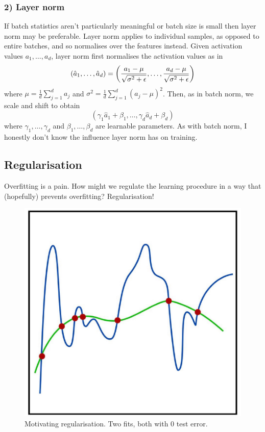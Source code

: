 \documentclass[11pt]{article}
\begin{document}
\subsubsection*{2) Layer norm}
If batch statistics aren't particularly meaningful or batch size is small then layer norm may be preferable. Layer norm applies to individual samples, as opposed to entire batches, and so normalises over the features instead. Given activation values $a_1,\dots,a_d$, layer norm first normalises the activation values as in
$$
(\hat{a}_1,\dots,\hat{a}_d)
=
\left(\frac{a_1-\mu}{\sqrt{\sigma^2+\epsilon}},\dots,\frac{a_d-\mu}{\sqrt{\sigma^2+\epsilon}}\right)
$$
where $\mu=\frac{1}{d}\sum_{j=1}^da_j$ and $\sigma^2=\frac{1}{d}\sum_{j=1}^d(a_j-\mu)^2$. Then, as in batch norm, we scale and shift to obtain
$$
(\gamma_1\hat{a}_1+\beta_1,\dots,\gamma_d\hat{a}_d+\beta_d)
$$
where $\gamma_1,\dots,\gamma_d$ and $\beta_1,\dots,\beta_d$ are learnable parameters. As with batch norm, I honestly don't know the influence layer norm has on training.

\subsection{Regularisation}
Overfitting is a pain. How might we regulate the learning procedure in a way that (hopefully) prevents overfitting? Regularisation!

\begin{figure}[t]
    \centering
    \begin{minipage}{0.44\linewidth}
        \includegraphics[width=1\linewidth]{./figures/supervised_learning/regularisation_two_plots_zero_test_error.pdf}
    \end{minipage}%
    \hfill
    \begin{minipage}{0.55\linewidth}
        \caption{Motivating regularisation. Two fits, both with 0 test error.}
        \label{fig:regularisation_two_plots}
    \end{minipage}
\end{figure}
\end{document}
